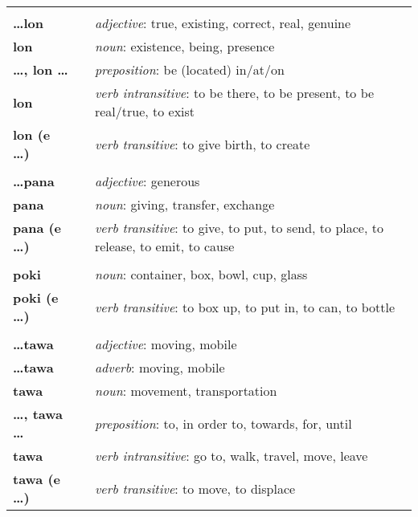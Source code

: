 \begin{supertabular}{p{2,5cm}|ll}
 && \\ %
%
\textbf{\dots lon} && \textit{adjective}: true, existing, correct, real, genuine \\ %
\textbf{lon} && \textit{noun}: existence, being, presence \\ %
\textbf{\dots , lon \dots} && \textit{preposition}: be (located) in/at/on \\ %
\textbf{lon} && \textit{verb intransitive}: to be there, to be present, to be real/true, to exist \\ %
\textbf{lon (e \dots)} && \textit{verb transitive}: to give birth, to create \\ %
 && \\ %
%
\textbf{\dots pana} && \textit{adjective}: generous \\ %
\textbf{pana} && \textit{noun}: giving, transfer, exchange \\ %
\textbf{pana (e \dots)} && \textit{verb transitive}: to give, to put, to send, to place, to release, to emit, to cause \\ %
 && \\ %
%
\textbf{poki} && \textit{noun}: container, box, bowl, cup, glass \\ %
\textbf{poki (e \dots)} && \textit{verb transitive}: to box up, to put in, to can, to bottle \\ %
 && \\ %
%
\textbf{\dots tawa} && \textit{adjective}: moving, mobile \\ %
\textbf{\dots tawa} && \textit{adverb}: moving, mobile \\ %
\textbf{tawa} && \textit{noun}: movement, transportation \\ %
\textbf{\dots , tawa \dots} && \textit{preposition}: to, in order to, towards, for, until \\ %
\textbf{tawa} && \textit{verb intransitive}: go to, walk, travel, move, leave \\ %
\textbf{tawa (e \dots)} && \textit{verb transitive}: to move, to displace \\ %
\end{supertabular} \\
%
\newpage{}
%
